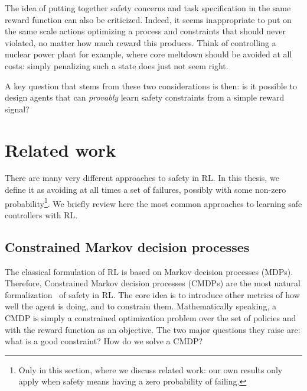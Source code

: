 	The idea of putting together safety concerns and task specification in the same reward function can also be criticized. Indeed, it seems inappropriate to put on the same scale actions optimizing a process and constraints that should never violated, no matter how much reward this produces. Think of controlling a nuclear power plant for example, where core meltdown should be avoided at all costs: simply penalizing such a state does just not seem right.\par
	A key question that stems from these two considerations is then: is it possible to design agents that can\emph{ provably} learn safety constraints from a simple reward signal?
	
\section{Related work}
	There are many very different approaches to safety in RL. In this thesis, we define it as avoiding at all times a set of failures, possibly with some non-zero probability\footnote{Only in this section, where we discuss related work: our own results only apply when safety means having a zero probability of failing.}. We briefly review here the most common approaches to learning safe controllers with RL.
	
	\subsection{Constrained Markov decision processes} \label{subsec:CMDPs related work}
		The classical formulation of RL is based on Markov decision processes (MDPs). Therefore, Constrained Markov decision processes (CMDPs) are the most natural formalization~\cite{garcia2015comprehensive} of safety in RL. The core idea is to introduce other metrics of how well the agent is doing, and to constrain them. Mathematically speaking, a CMDP is simply a constrained optimization problem over the set of policies and with the reward function as an objective. The two major questions they raise are: what is a good constraint? How do we solve a CMDP?
		
